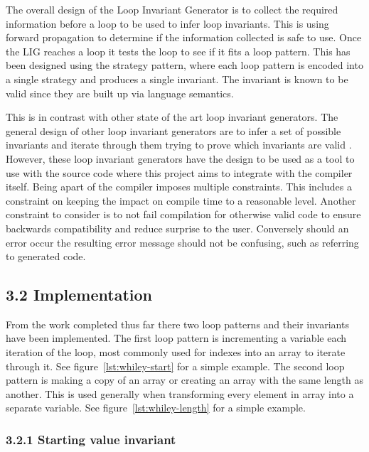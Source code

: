 \documentclass[11pt, a4paper, twoside, openright]{report}
\begin{document}
The overall design of the Loop Invariant Generator is to collect the required
information before a loop to be used to infer loop invariants.
This is using forward propagation to determine if the
information collected is safe to use. Once the LIG reaches a loop
it tests the loop to see if it fits a loop pattern. This has been
designed using the strategy pattern, where each loop pattern is encoded
into a single strategy and produces a single invariant.
The invariant is known to be valid since they are built up via language
semantics.

This is in contrast with other state of the art loop invariant generators.
The general design of other loop invariant generators are to infer a set
of possible invariants and iterate through them trying to prove which
invariants are valid \cite{infer-dynamic} \cite{infer-postconditions}.
However, these loop invariant generators have the design to be used as a tool
to use with the source code where this project aims to integrate with the
compiler itself. Being apart of the compiler imposes multiple constraints.
This includes a constraint on keeping the impact on compile time to a
reasonable level.
Another constraint to consider is to not fail compilation for otherwise valid
code to ensure backwards compatibility and reduce surprise to the user.
Conversely should an error occur the resulting error message should not be
confusing, such as referring to generated code.

\subsection*{3.2 Implementation}


From the work completed thus far there two loop patterns and their invariants
have been implemented. The first loop pattern is incrementing a variable
each iteration of the loop, most commonly used for indexes into an array to
iterate through it. See figure~\ref{lst:whiley-start} for a simple example.
The second loop pattern is making a copy of an array or creating an array with
the same length as another.
This is used generally when transforming every element in array into a separate
variable. See figure~\ref{lst:whiley-length} for a simple example.

\subsubsection*{3.2.1 Starting value invariant}
\end{document}

